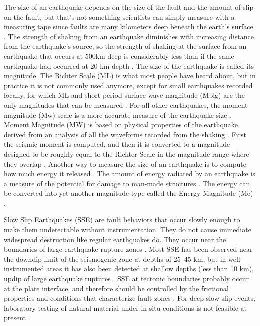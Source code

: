 \documentclass[]{llncs} %
\begin{document}
The size of an earthquake depends on the size of the fault and the amount of slip on the fault, but that’s not something scientists can simply measure with a measuring tape since faults are many kilometers deep beneath the earth’s surface \cite{Wald}. The strength of shaking from an earthquake diminishes with increasing distance from the earthquake's source, so the strength of shaking at the surface from an earthquake that occurs at 500km deep is considerably less than if the same earthquake had occurred at 20 km depth \cite{Wald}. The size of the earthquake is called its magnitude. The Richter Scale (ML) is what most people have heard about, but in practice it is not commonly used anymore, except for small earthquakes recorded locally, for which ML and short-period surface wave magnitude (Mblg) are the only magnitudes that can be measured \cite{Hayes}. For all other earthquakes, the moment magnitude (Mw) scale is a more accurate measure of the earthquake size \cite{Hayes}. Moment Magnitude (MW) is based on physical properties of the earthquake derived from an analysis of all the waveforms recorded from the shaking \cite{Hayes}. First the seismic moment is computed, and then it is converted to a magnitude designed to be roughly equal to the Richter Scale in the magnitude range where they overlap \cite{Hayes}. Another way to measure the size of an earthquake is to compute how much energy it released \cite{Hayes}. The amount of energy radiated by an earthquake is a measure of the potential for damage to man-made structures \cite{Hayes}. The energy can be converted into yet another magnitude type called the Energy Magnitude (Me) \cite{Hayes}. \par
Slow Slip Earthquakes (SSE) are fault behaviors that occur slowly enough to make them undetectable without instrumentation. They do not cause immediate widespread destruction like regular earthquakes do. They occur near the boundaries of large earthquake rupture zones \cite{Slip}. Most SSE has been observed near the downdip limit of the seismogenic zone at depths of 25–45 km, but in well-instrumented areas it has also been detected at shallow depths
(less than 10 km), updip of large earthquake ruptures \cite{Slip}. SSE at tectonic boundaries probably occur at the plate interface, and therefore should be controlled by the frictional properties and conditions that characterize fault zones \cite{Slip}. For deep slow slip events, laboratory testing of natural material under in situ conditions is not feasible at present \cite{Slip}.  
\end{document}

